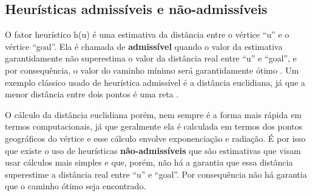 



\subsection{Heurísticas admissíveis e não-admissíveis}
\label{sec-aestrela-algoritmo-heuristica}  
O fator heurístico h(u) é uma estimativa da distância entre o vértice ``u'' e o vértice ``goal''. Ela é chamada de \textbf{admissível} quando o valor da estimativa garantidamente não superestima o valor da distância real entre ``u'' e ``goal'', e por consequência, o valor do caminho mínimo será garantidamente ótimo \cite{russell1995modern}. Um exemplo clássico usado de heurística admissível é a distância euclidiana, já que a menor distância entre dois pontos é uma reta \cite{russell1995modern}.

O cálculo da distância euclidiana porém, nem sempre é a forma mais rápida em termos computacionais, já que geralmente ela é calculada em termos dos pontos geográficos do vértice e esse cálculo envolve exponenciação e radiação. É por isso que existe o uso de heurísticas \textbf{não-admissíveis} que são estimativas que visam usar cálculos mais simples e que, porém, não há a garantia que essa distância superestime a distância real entre ``u'' e ``goal''. Por consequência não há garantia que o caminho ótimo seja encontrado.

